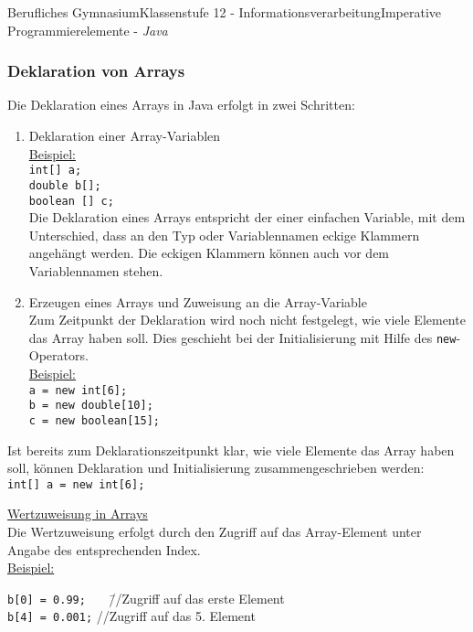 \documentclass[oneside,openany,headings=optiontotoc,11pt,numbers=noenddot]{article}
\begin{document}
\begin{worksheet}{Berufliches Gymnasium}{Klassenstufe 12 - Informationsverarbeitung}{Imperative Programmierelemente - \textit{Java}}
		\subsubsection{Deklaration von Arrays}
		Die Deklaration eines Arrays in Java erfolgt in zwei Schritten:\\
		\begin{enumerate}
			\item Deklaration einer Array-Variablen\\
			\underline{Beispiel:}\\
			\lstinline[style=JavaInputStyle]|int[] a;|\\
			\lstinline[style=JavaInputStyle]|double b[];|\\
			\lstinline[style=JavaInputStyle]|boolean [] c;|\\
			Die Deklaration eines Arrays entspricht der einer einfachen Variable, mit dem Unterschied, dass an den Typ oder Variablennamen eckige Klammern angehängt werden. Die eckigen Klammern können auch vor dem Variablennamen stehen.
			\item Erzeugen eines Arrays und Zuweisung an die Array-Variable\\
			Zum Zeitpunkt der Deklaration wird noch nicht festgelegt, wie viele Elemente das Array haben soll. Dies geschieht bei der Initialisierung mit Hilfe des \lstinline[style=JavaInputStyle]|new|-Operators.\\
			\underline{Beispiel:}\\
			\lstinline[style=JavaInputStyle]|a = new int[6];|\\
			\lstinline[style=JavaInputStyle]|b = new double[10];|\\
			\lstinline[style=JavaInputStyle]|c = new boolean[15];|
		\end{enumerate}
		Ist bereits zum Deklarationszeitpunkt klar, wie viele Elemente das Array haben soll, können Deklaration und Initialisierung zusammengeschrieben werden:\\
		\lstinline[style=JavaInputStyle]|int[] a = new int[6];|\\
		\par\noindent
		\underline{Wertzuweisung in Arrays}\\
		Die Wertzuweisung erfolgt durch den Zugriff auf das Array-Element unter Angabe des entsprechenden Index.\\
		\underline{Beispiel:}
		\begin{tabbing}
			\lstinline[style=JavaInputStyle]|b[0] = 0.99;|~~~ \= //Zugriff auf das erste Element\\
			\lstinline[style=JavaInputStyle]|b[4] = 0.001;| \> //Zugriff auf das 5. Element
		\end{tabbing}

\end{worksheet}
\end{document}
